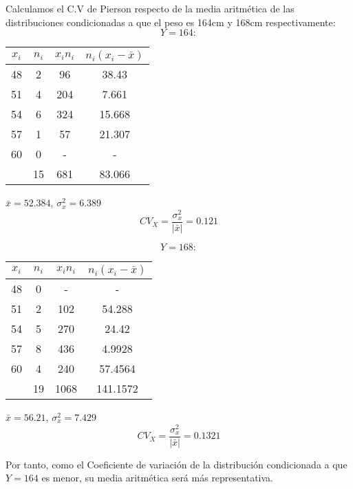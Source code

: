 \documentclass[a4paper,12pt]{article}
\begin{document}
\begin{enumerate}
    Calculamos el C.V de Pierson respecto de la media aritmética de las distribuciones condicionadas a que el peso es 164cm y 168cm respectivamente:\\
    
    $$Y=164:$$
\begin{center}
    \begin{tabular}{cccc}
    $x_i$ & $n_i$ & $x_in_i$ & $n_i(x_i-\bar x)$ \\
    \hline
    48 & 2 & 96 & 38.43\\ 
    51 & 4 & 204 & 7.661\\
    54 & 6 & 324 & 15.668\\
    57 & 1 & 57 & 21.307\\
    60 & 0 & - & -\\
    \hline
     & 15 & 681 & 83.066\\
    \end{tabular}
    \end{center}
    
    $\bar x = 52.384$, $\sigma_x^2=6.389$
    $$CV_X= \frac{\sigma_x^2}{|\bar x|} = 0.121$$
    
    $$Y=168:$$
\begin{center}
    \begin{tabular}{cccc}
    $x_i$ & $n_i$ & $x_in_i$ & $n_i(x_i-\bar x)$ \\
    \hline
    48 & 0 & - & -\\ 
    51 & 2 & 102 & 54.288\\
    54 & 5 & 270 & 24.42\\
    57 & 8 & 436 & 4.9928\\
    60 & 4 & 240 & 57.4564\\
    \hline
     & 19 & 1068 & 141.1572\\
    \end{tabular}
    \end{center}
    $\bar x = 56.21$, $\sigma_x^2=7.429$
    $$CV_X= \frac{\sigma_x^2}{|\bar x|} = 0.1321$$

    Por tanto, como el Coeficiente de variación de la distribución condicionada a que $Y=164$ es menor, su media aritmética será más representativa.
    
\end{enumerate}
\end{document}
